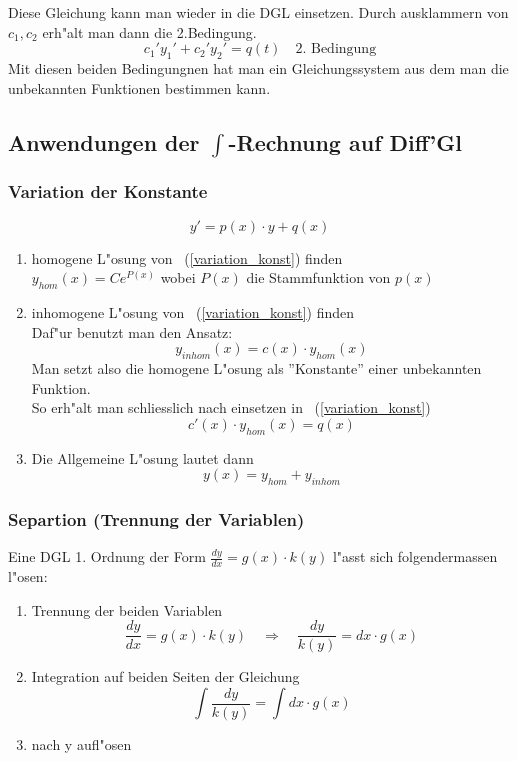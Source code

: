 \documentclass[10pt, a4paper, twocolumn]{scrartcl}
\begin{document}
Diese Gleichung kann man wieder in die DGL einsetzen. Durch ausklammern von $c_1,c_2$ erh"alt man dann die 2.Bedingung.
$$c_1'y_1'+c_2'y_2'=q(t)\quad \mbox{2. Bedingung}$$
Mit diesen beiden Bedingungnen hat man ein Gleichungssystem aus dem man die unbekannten Funktionen bestimmen kann.

\subsection{Anwendungen der $\int$-Rechnung auf Diff'Gl}

\subsubsection{Variation der Konstante}

\begin{equation}
 \label{variation_konst}
 y'=p(x)\cdotp y + q(x)
\end{equation}

\begin{enumerate}
 \item homogene L"osung von ~(\ref{variation_konst}) finden\\
  $y_{hom}(x)=Ce^{P(x)}$ wobei $P(x)$ die Stammfunktion von $p(x)$
 \item inhomogene L"osung von ~(\ref{variation_konst}) finden\\
  Daf"ur benutzt man den Ansatz: 
  $$y_{inhom}(x)=c(x)\cdotp y_{hom}(x)$$
  Man setzt also die homogene L"osung als ''Konstante'' einer unbekannten Funktion.\\
  So erh"alt man schliesslich nach einsetzen in ~(\ref{variation_konst})
  $$c'(x)\cdotp y_{hom}(x)=q(x)$$
 \item Die Allgemeine L"osung lautet dann
  $$y(x)=y_{hom}+y_{inhom}$$
\end{enumerate}

\subsubsection{Separtion (Trennung der Variablen)}

Eine DGL 1. Ordnung der Form $\frac{dy}{dx}=g(x)\cdotp k(y)$ l"asst sich folgendermassen l"osen:
\begin{enumerate}
 \item Trennung der beiden Variablen
  $$\frac{dy}{dx}=g(x)\cdotp k(y)\quad\Rightarrow\quad \frac{dy}{k(y)}=dx\cdotp g(x)$$
 \item Integration auf beiden Seiten der Gleichung
  $$\int\frac{dy}{k(y)}=\int dx\cdotp g(x)$$
 \item nach y aufl"osen
\end{enumerate}
\end{document}
